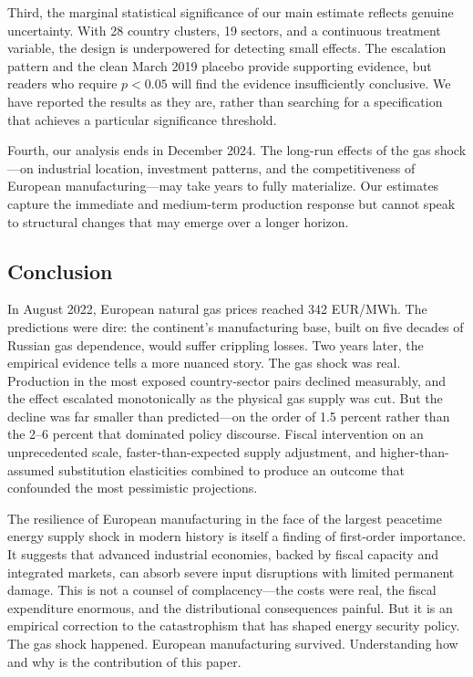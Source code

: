 \documentclass[12pt]{article}
\begin{document}
Third, the marginal statistical significance of our main estimate reflects genuine uncertainty. With 28 country clusters, 19 sectors, and a continuous treatment variable, the design is underpowered for detecting small effects. The escalation pattern and the clean March 2019 placebo provide supporting evidence, but readers who require $p < 0.05$ will find the evidence insufficiently conclusive. We have reported the results as they are, rather than searching for a specification that achieves a particular significance threshold.

Fourth, our analysis ends in December 2024. The long-run effects of the gas shock---on industrial location, investment patterns, and the competitiveness of European manufacturing---may take years to fully materialize. Our estimates capture the immediate and medium-term production response but cannot speak to structural changes that may emerge over a longer horizon.

\subsection{Conclusion}

In August 2022, European natural gas prices reached 342 EUR/MWh. The predictions were dire: the continent's manufacturing base, built on five decades of Russian gas dependence, would suffer crippling losses. Two years later, the empirical evidence tells a more nuanced story. The gas shock was real. Production in the most exposed country-sector pairs declined measurably, and the effect escalated monotonically as the physical gas supply was cut. But the decline was far smaller than predicted---on the order of 1.5 percent rather than the 2--6 percent that dominated policy discourse. Fiscal intervention on an unprecedented scale, faster-than-expected supply adjustment, and higher-than-assumed substitution elasticities combined to produce an outcome that confounded the most pessimistic projections.

The resilience of European manufacturing in the face of the largest peacetime energy supply shock in modern history is itself a finding of first-order importance. It suggests that advanced industrial economies, backed by fiscal capacity and integrated markets, can absorb severe input disruptions with limited permanent damage. This is not a counsel of complacency---the costs were real, the fiscal expenditure enormous, and the distributional consequences painful. But it is an empirical correction to the catastrophism that has shaped energy security policy. The gas shock happened. European manufacturing survived. Understanding how and why is the contribution of this paper.
\end{document}
